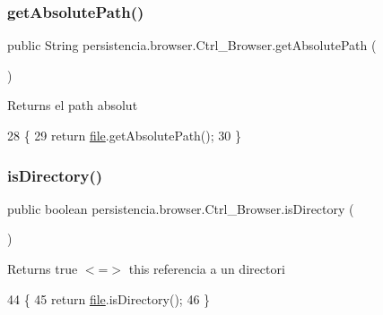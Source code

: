 \subsubsection{\texorpdfstring{get\+Absolute\+Path()}{getAbsolutePath()}}
{\footnotesize\ttfamily public String persistencia.\+browser.\+Ctrl\+\_\+\+Browser.\+get\+Absolute\+Path (\begin{DoxyParamCaption}{ }\end{DoxyParamCaption})\hspace{0.3cm}{\ttfamily [inline]}}

\begin{DoxyReturn}{Returns}
el path absolut 
\end{DoxyReturn}

\begin{DoxyCode}
28                                     \{
29         \textcolor{keywordflow}{return} \hyperlink{classpersistencia_1_1browser_1_1Ctrl__Browser_a72c151aed575c0848f7dbb1609b373c8}{file}.getAbsolutePath();
30     \}
\end{DoxyCode}
\mbox{\label{classpersistencia_1_1browser_1_1Ctrl__Browser_abdf13ea9a8d928b1efc6f3a69e18f6c6}} 
\subsubsection{\texorpdfstring{is\+Directory()}{isDirectory()}}
{\footnotesize\ttfamily public boolean persistencia.\+browser.\+Ctrl\+\_\+\+Browser.\+is\+Directory (\begin{DoxyParamCaption}{ }\end{DoxyParamCaption})\hspace{0.3cm}{\ttfamily [inline]}}

\begin{DoxyReturn}{Returns}
true $<$=$>$ this referencia a un directori 
\end{DoxyReturn}

\begin{DoxyCode}
44                                  \{
45         \textcolor{keywordflow}{return} \hyperlink{classpersistencia_1_1browser_1_1Ctrl__Browser_a72c151aed575c0848f7dbb1609b373c8}{file}.isDirectory();
46     \}
\end{DoxyCode}
\mbox{\label{classpersistencia_1_1browser_1_1Ctrl__Browser_a22b50558c4e066fe0e486def502bd30d}} 
